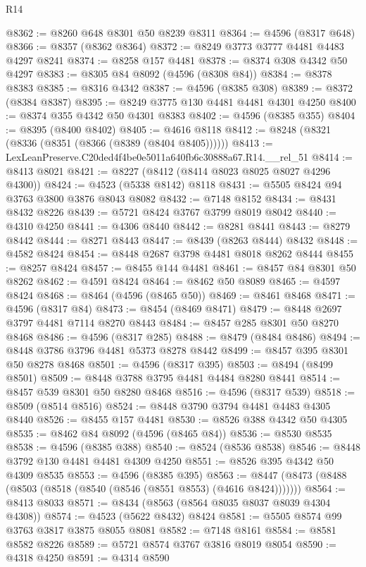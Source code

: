\begin{lexlean}{R14}
\begin{coremodule}
@8362 := @8260 @648 @8301 @50 @8239 @8311
@8364 := @4596 (@8317 @648)
@8366 := @8357 (@8362 @8364)
@8372 := @8249 @3773 @3777 @4481 @4483 @4297 @8241
@8374 := @8258 @157 @4481
@8378 := @8374 @308 @4342 @50 @4297
@8383 := @8305 @84 @8092 (@4596 (@8308 @84))
@8384 := @8378 @8383
@8385 := @8316 @4342
@8387 := @4596 (@8385 @308)
@8389 := @8372 (@8384 @8387)
@8395 := @8249 @3775 @130 @4481 @4481 @4301 @4250
@8400 := @8374 @355 @4342 @50 @4301 @8383
@8402 := @4596 (@8385 @355)
@8404 := @8395 (@8400 @8402)
@8405 := @4616 @8118
@8412 := @8248 (@8321 (@8336 (@8351 (@8366 (@8389 (@8404 @8405))))))
@8413 := LexLeanPreserve.C20ded4f4be0e5011a640fb6c30888a67.R14.__rel_51
@8414 := @8413 @8021
@8421 := @8227 (@8412 (@8414 @8023 @8025 @8027 @4296 @4300))
@8424 := @4523 (@5338 @8142) @8118
@8431 := @5505 @8424 @94 @3763 @3800 @3876 @8043 @8082
@8432 := @7148 @8152
@8434 := @8431 @8432 @8226
@8439 := @5721 @8424 @3767 @3799 @8019 @8042
@8440 := @4310 @4250
@8441 := @4306 @8440
@8442 := @8281 @8441
@8443 := @8279 @8442
@8444 := @8271 @8443
@8447 := @8439 (@8263 @8444) @8432
@8448 := @4582 @8424
@8454 := @8448 @2687 @3798 @4481 @8018 @8262 @8444
@8455 := @8257 @8424
@8457 := @8455 @144 @4481
@8461 := @8457 @84 @8301 @50 @8262
@8462 := @4591 @8424
@8464 := @8462 @50 @8089
@8465 := @4597 @8424
@8468 := @8464 (@4596 (@8465 @50))
@8469 := @8461 @8468
@8471 := @4596 (@8317 @84)
@8473 := @8454 (@8469 @8471)
@8479 := @8448 @2697 @3797 @4481 @7114 @8270 @8443
@8484 := @8457 @285 @8301 @50 @8270 @8468
@8486 := @4596 (@8317 @285)
@8488 := @8479 (@8484 @8486)
@8494 := @8448 @3786 @3796 @4481 @5373 @8278 @8442
@8499 := @8457 @395 @8301 @50 @8278 @8468
@8501 := @4596 (@8317 @395)
@8503 := @8494 (@8499 @8501)
@8509 := @8448 @3788 @3795 @4481 @4484 @8280 @8441
@8514 := @8457 @539 @8301 @50 @8280 @8468
@8516 := @4596 (@8317 @539)
@8518 := @8509 (@8514 @8516)
@8524 := @8448 @3790 @3794 @4481 @4483 @4305 @8440
@8526 := @8455 @157 @4481
@8530 := @8526 @388 @4342 @50 @4305
@8535 := @8462 @84 @8092 (@4596 (@8465 @84))
@8536 := @8530 @8535
@8538 := @4596 (@8385 @388)
@8540 := @8524 (@8536 @8538)
@8546 := @8448 @3792 @130 @4481 @4481 @4309 @4250
@8551 := @8526 @395 @4342 @50 @4309 @8535
@8553 := @4596 (@8385 @395)
@8563 := @8447 (@8473 (@8488 (@8503 (@8518 (@8540 (@8546 (@8551 @8553) (@4616 @8424)))))))
@8564 := @8413 @8033
@8571 := @8434 (@8563 (@8564 @8035 @8037 @8039 @4304 @4308))
@8574 := @4523 (@5622 @8432) @8424
@8581 := @5505 @8574 @99 @3763 @3817 @3875 @8055 @8081
@8582 := @7148 @8161
@8584 := @8581 @8582 @8226
@8589 := @5721 @8574 @3767 @3816 @8019 @8054
@8590 := @4318 @4250
@8591 := @4314 @8590

\end{coremodule}
\end{lexlean}
